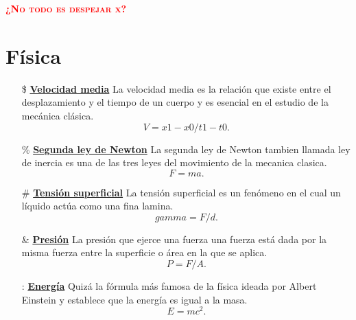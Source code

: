 \documentclass[12pt,letterpaper]{article}
\begin{document}
\pagecolor{orange}
\color{green}
\begin{center}
    {\textcolor{red}{\textbf{\textsc{\Huge{¿No todo es despejar x?}}}}}
\end{center}
\section*{Física}
\begin{itemize}
    \item[\$] \textbf{\underline{{Velocidad media}}}\newline
    La velocidad media es la relación que existe entre el desplazamiento y el tiempo de un cuerpo y es esencial en el estudio de la mecánica clásica.
    $$V={x1-x0}/{t1-t0}.$$
    \item[\%]\textbf{\underline{{Segunda ley de Newton}}}\newline
    La segunda ley de Newton tambien llamada ley de inercia es una de las tres leyes del movimiento de la mecanica clasica.
     $$F=ma.$$
     \item[\#]\textbf{\underline{{Tensión superficial}}}\newline
     La tensión superficial es un fenómeno en el cual un líquido actúa como una fina lamina.
     $${gamma}=F/d.$$
     \item[\&]\textbf{\underline{{Presión}}}\newline
     La presión que ejerce una fuerza una fuerza está dada por la misma fuerza entre la superficie o área en la que se aplica.
     $$P=F/A.$$
     \item[:] \textbf{\underline{{Energía}}}\newline
     Quizá la fórmula más famosa de la física ideada por Albert Einstein y establece que la energía es igual a la masa.
     $$E=mc^{2}.$$
\end{itemize}
\newpage
\end{document}
